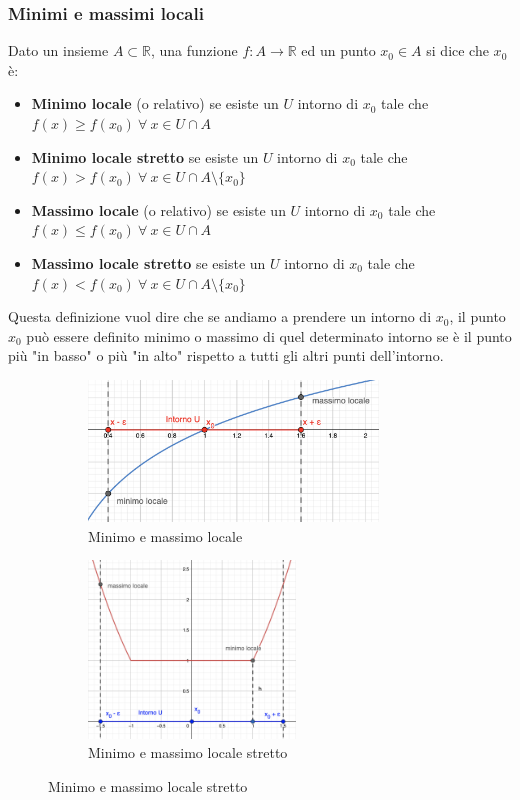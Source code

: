 \subsubsection{Minimi e massimi locali}
\begin{definition}
    Dato un insieme $A \subset \mathbb{R}$, una funzione $f: A \longrightarrow \mathbb{R}$ ed un punto $x_0 \in A$ si dice che $x_0$ è:
    \begin{itemize}
        \item \textbf{Minimo locale} (o relativo) se esiste un $U$ intorno di $x_0$ tale che $f(x) \geq f(x_0) \: \forall \: x \in U \cap A$
        \item \textbf{Minimo locale stretto} se esiste un $U$ intorno di $x_0$ tale che $f(x) > f(x_0) \: \forall \: x \in U \cap A \setminus \{x_0\}$
        \item \textbf{Massimo locale} (o relativo) se esiste un $U$ intorno di $x_0$ tale che $f(x) \leq f(x_0) \: \forall \: x \in U \cap A$
        \item \textbf{Massimo locale stretto} se esiste un $U$ intorno di $x_0$ tale che $f(x) < f(x_0) \: \forall \: x \in U \cap A \setminus \{x_0\}$
    \end{itemize}
\end{definition}
Questa definizione vuol dire che se andiamo a prendere un intorno di $x_0$, il punto $x_0$ può essere definito minimo o massimo di quel determinato intorno se è il punto più "in basso" o più "in alto" rispetto a tutti gli altri punti dell'intorno.
\begin{figure}[h!]
    \begin{subfigure}{.5\textwidth}
        \centering
        \includegraphics[width=7.7cm]{images/min-max-locale.png}
        \caption{Minimo e massimo locale}
        \label{fig:min-max-locale}
    \end{subfigure}
    \begin{subfigure}{.5\textwidth}
        \centering
        \includegraphics[width=5.5cm]{images/min-max-locale-stretto.png}
        \caption{Minimo e massimo locale stretto}
        \label{fig:min-max-locale-stretto}
    \end{subfigure}
\end{figure}

